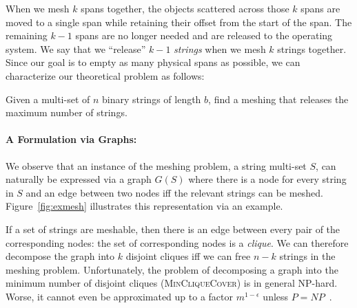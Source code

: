 When we mesh $k$ spans together, the objects scattered across those
$k$ spans are moved to a single span while retaining their offset from
the start of the span. The remaining $k-1$ spans are no longer needed
and are released to the operating system. We say that we ``release''
$k-1$ \emph{strings} when we mesh $k$ strings together.  Since our
goal is to empty as many physical spans as possible, we can
characterize our theoretical problem as follows:

\begin{problem}
Given a multi-set of $n$ binary strings of length $b$, find a meshing
that releases the maximum number of strings.
\end{problem}


\paragraph{A Formulation via Graphs:}
\label{subsec:graph}

We observe that an instance of the meshing problem, a string multi-set
$S$, can naturally be expressed via a graph $G(S)$ where there is a
node for every string in $S$ and an edge between two nodes iff the
relevant strings can be meshed. Figure~\ref{fig:exmesh} illustrates
this representation via an example.



If a set of strings are meshable, then there is an edge between every
pair of the corresponding nodes: the set of corresponding nodes is a
\emph{clique}. We can therefore decompose the graph into $k$ disjoint
cliques iff we can free $n-k$ strings in the meshing
problem. Unfortunately, the problem of decomposing a graph into the
minimum number of disjoint cliques (\textsc{MinCliqueCover}) is in
general NP-hard. Worse, it cannot even be approximated up to a factor
$m^{1-\epsilon}$ unless $P=NP$~\cite{zuckerman07}.


